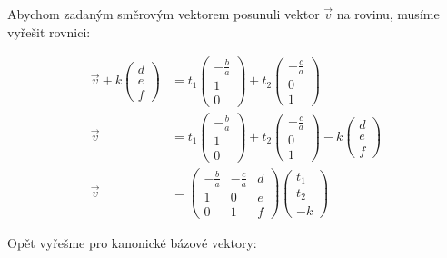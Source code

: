 \documentclass[12pt]{article}
\begin{document}
  Abychom zadaným směrovým vektorem posunuli vektor $\vec{v}$ na rovinu, musíme vyřešit rovnici:

    \begin{align*}
      \vec{v} + k \left(\begin{array}{c} d\\e\\f \end{array}\right) &=
        t_1 \left(\begin{array}{c} -\frac{b}{a}\\1\\0 \end{array}\right) + t_2 \left(\begin{array}{c} -\frac{c}{a}\\0\\1 \end{array}\right) \\
      \vec{v} &=
        t_1 \left(\begin{array}{c} -\frac{b}{a}\\1\\0 \end{array}\right) + t_2 \left(\begin{array}{c} -\frac{c}{a}\\0\\1 \end{array}\right)
        - k \left(\begin{array}{c} d\\e\\f \end{array}\right) \\
      \vec{v} &=
        \left(\begin{array}{ccc} -\frac{b}{a} & -\frac{c}{a} & d \\ 1 & 0 & e \\ 0 & 1 & f \end{array}\right) \left(\begin{array}{c} t_1\\t_2\\-k \end{array}\right)
    \end{align*}
  
  Opět vyřešme pro kanonické bázové vektory:
\end{document}
